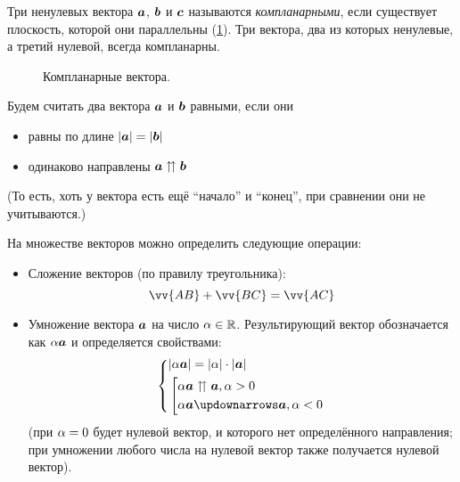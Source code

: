 \documentclass[a4paper,12pt]{article}
\begin{document}
  \begin{definition}[Компланарность]
    Три ненулевых вектора $\boldsymbol a$, $\boldsymbol b$ и $\boldsymbol c$ называются \emph{компланарными}, если существует плоскость, которой они параллельны (\ref{fig:coplanarity}).
    Три вектора, два из которых ненулевые, а третий нулевой, всегда компланарны.
  \end{definition}
  
  \begin{figure}[h]
    \centering
    
    
    \caption{Компланарные вектора.}
    \label{fig:coplanarity}
  \end{figure}
  
  \begin{definition}
    Будем считать два вектора $\boldsymbol a$ и $\boldsymbol b$ равными, если они
    \begin{itemize}
      \item равны по длине $|\boldsymbol a| = |\boldsymbol b|$
      \item одинаково направлены $\boldsymbol a \upuparrows \boldsymbol b$
    \end{itemize}
    
    (То есть, хоть у вектора есть ещё ``начало'' и ``конец'', при сравнении они не учитываются.)
  \end{definition}
  
  На множестве векторов можно определить следующие операции:
  \begin{itemize}
    \item Сложение векторов (по правилу треугольника):  %
      \[
        \vv{AB} + \vv{BC} = \vv{AC}
      \]
    \item Умножение вектора $\boldsymbol a$ на число $\alpha \in \operatorname{\mathbb R}$.
      Результирующий вектор обозначается как $\alpha \boldsymbol a$ и определяется свойствами:
      \[
        \left\{
          \begin{aligned}
            &|\alpha \bds a| = |\alpha| \cdot |\bds a|\\
            &\left[
               \begin{aligned}
                 &\alpha \bds a \upuparrows \bds a, \alpha > 0\\
                 &\alpha \bds a \updownarrows \bds a, \alpha < 0
               \end{aligned}
             \right.
          \end{aligned}
        \right.
      \]
      (при $\alpha \hm= 0$ будет нулевой вектор, и которого нет определённого направления; при умножении любого числа на нулевой вектор также получается нулевой вектор).
  \end{itemize}
  
\end{document}
